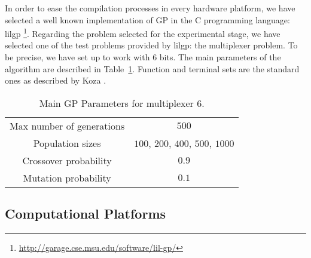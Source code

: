 In order to ease the compilation processes in every hardware platform,
we have selected a well known implementation of GP in the C
programming language:  lilgp \footnote{\url{http://garage.cse.msu.edu/software/lil-gp/}}. %
Regarding the problem selected for the experimental stage, we have
selected one of the test problems provided by lilgp: the multiplexer
problem. To be precise, we have set up to work with 6 bits. The main
parameters of the algorithm are described in Table~\ref{Table:par_gp}.
Function and terminal sets are the standard ones as described by Koza
\cite{Koza1992}. 



\begin{table}[!t]
\centering
\caption{Main GP Parameters for multiplexer 6.}
\label{Table:par_gp}
\begin{tabular}{cc}
\hline
Max number of generations & $500$ \\
Population sizes & $100$, $200$, $400$, $500$, $1000$ \\
Crossover probability & $0.9$ \\ 
Mutation probability & $0.1$ \\ 
\hline
\end{tabular}
\end{table}


\subsection{Computational Platforms}
\label{compplat}

